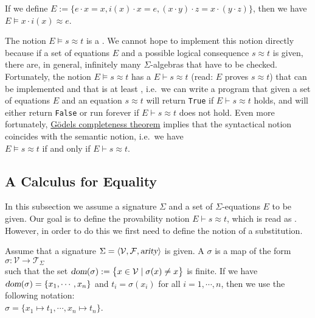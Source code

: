 \example
If we define $E := \bigl\{ e \cdot x = x, i(x) \cdot x = e, (x \cdot y) \cdot z = x \cdot (y \cdot z) \bigr\}$,
then we have
\\[0.2cm]
\hspace*{1.3cm}
$E \models x \cdot i(x) \approx e$.  \eox

The notion $E \models s \approx t$ is a .  We cannot hope to implement this notion directly
because if a set of equations $E$ and a possible logical consequence $s \approx t$ is given, there are, in
general, infinitely many $\Sigma$-algebras that have to be checked.  Fortunately, the notion 
$E \models s \approx t$ has a  $E \vdash s \approx t$ (read: $E$ proves $s \approx t$)
that can be implemented and that is at least , i.e.~we can write a program that given 
a set of equations $E$ and an equation $s \approx t$ will return \texttt{True} if $E \vdash s \approx t$ holds, and will
either return \texttt{False} or run forever if $E \vdash s \approx t$ does not hold.  Even more fortunately,
\href{https://en.wikipedia.org/wiki/Gödel%27s_completeness_theorem}{G\"{o}dels completeness theorem} 
implies that the syntactical notion coincides with the semantic notion, i.e.~we have
\\[0.2cm]
\hspace*{1.3cm}
$E \models s \approx t$ \quad if and only if \quad $E \vdash s \approx t$.

\subsection{A Calculus for Equality}
In this subsection we assume a signature $\Sigma$ and a set of $\Sigma$-equations $E$ to be given.  
Our goal is to define the provability notion $E \vdash s \approx t$, which is read as .
However, in order to do this we first need to define 
the notion of a substitution.

\begin{Definition}
  Assume that a signature $\Sigma = \langle \mathcal{V}, \mathcal{F}, \textsl{arity} \rangle$ is given.
  A  $\sigma$ is a map of the form
  \\[0.2cm]
  \hspace*{1.3cm}
  $\sigma: \mathcal{V} \rightarrow \mathcal{T}_\Sigma$ 
  \\[0.2cm]
  such that the set $\textsl{dom}(\sigma) := \bigl\{ x \in \mathcal{V} \mid \sigma(x) \not= x \bigr\}$ is finite.
  If we have $\textsl{dom}(\sigma) = \{ x_1, \cdots, x_n \}$ and $t_i = \sigma(x_i)$ for all $i = 1, \cdots, n$,
  then we use the following notation:
  \\[0.2cm]
  \hspace*{1.3cm}
  $\sigma = \{ x_1 \mapsto t_1, \cdots, x_n \mapsto t_n \}$.   \eoxs
\end{Definition}

